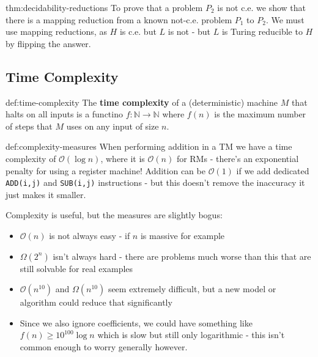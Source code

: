 \documentclass[landscape, 8pt]{extarticle}
\begin{document}
\begin{multicols}{3}
\begin{thm}{thm:decidability-reductions}{}
To prove that a problem $P_{2}$ is not c.e. we show that there is a mapping reduction from a known not-c.e. problem $P_{1}$ to $P_{2}$. We must use mapping reductions, as $H$ is c.e. but $L$ is not - but $L$ is Turing reducible to $H$ by flipping the answer.

\end{thm}

\subsection*{Time Complexity}
\begin{dfn}{def:time-complexity}{}
The \textbf{time complexity} of a (deterministic) machine $M$ that halts on all inputs is a functino $f : \mathbb{N} \to \mathbb{N}$ where $f(n)$ is the maximum number of steps that $M$ uses on any input of size $n$.
\end{dfn}


\begin{dfn}{def:complexity-measures}{}
When performing addition in a TM we have a time complexity of $\mathcal{O}(\log n)$, where it is $\mathcal{O}(n)$ for RMs - there's an exponential penalty for using a register machine!
\newline
Addition can be $\mathcal{O}(1)$ if we add dedicated \texttt{ADD(i,j)} and \texttt{SUB(i,j)} instructions - but this doesn't remove the inaccuracy it just makes it smaller.

Complexity is useful, but the measures are slightly bogus:
\begin{itemize}
    \item $\mathcal{O}(n)$ is not always easy - if $n$ is massive for example
    \item $\Omega(2^n)$ isn't always hard - there are problems much worse than this that are still solvable for real examples
    \item $\mathcal{O}(n^{10})$ and $\Omega(n^{10})$ seem extremely difficult, but a new model or algorithm could reduce that significantly
    \item Since we also ignore coefficients, we could have something like $f(n) \geq 10^{100} \log n$ which is slow but still only logarithmic - this isn't common enough to worry generally however.
\end{itemize}
\end{dfn}



\end{multicols}
\end{document}
